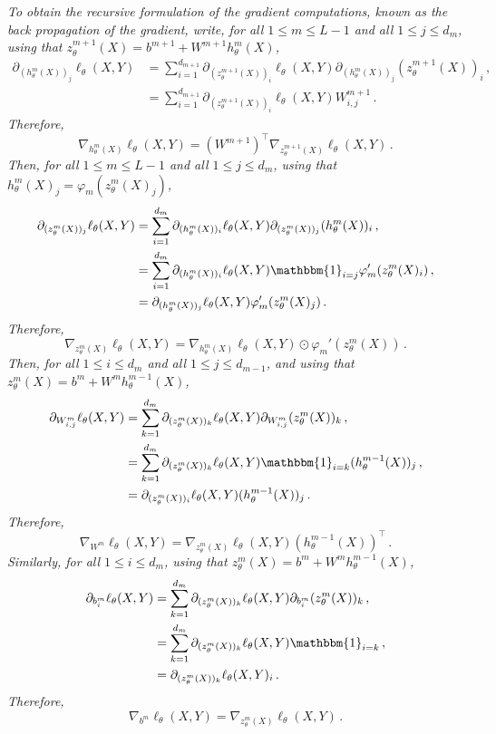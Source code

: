 \documentclass[a4paper,10pt,fleqn]{article}
\newcommand{\eqsp}{\,}
\newcommand{\1}{\ensuremath{\mathbbm{1}}}
\begin{document}
\begin{enumerate}
{\em
To obtain the recursive formulation of the gradient computations, known as the {\em back propagation} of the gradient, write, for all $1\leqslant m \leqslant L-1$ and all $1\leqslant j \leqslant d_m$,   using that $z_{\theta}^{m+1}(X) = b^{m+1} + W^{m+1}h_{\theta}^{m}(X)$,
\begin{align*}
\partial_{(h_{\theta}^m(X))_j}\ell_{\theta}(X,Y) &=  \sum_{i=1}^{d_{m+1}} \partial_{(z_{\theta}^{m+1}(X))_i}\ell_{\theta}(X,Y)\partial_{(h_{\theta}^m(X))_j}(z_{\theta}^{m+1}(X))_i\eqsp,\\
&=  \sum_{i=1}^{d_{m+1}} \partial_{(z_{\theta}^{m+1}(X))_i}\ell_{\theta}(X,Y)W^{m+1}_{i,j}\eqsp.
\end{align*}
Therefore,
$$
\nabla_{h_{\theta}^m(X)} \ell_{\theta}(X,Y) = (W^{m+1})^\top\nabla_{z_{\theta}^{m+1}(X)} \ell_{\theta}(X,Y) \eqsp.
$$
Then, for all $1\leqslant m \leqslant L-1$ and all $1\leqslant j \leqslant d_m$,  using that $h_{\theta}^{m}(X)_j =\varphi_m(z_{\theta}^{m}(X)_j)$,
\begin{align*}
\partial_{(z_{\theta}^m(X))_j}\ell_{\theta}(X,Y) &=  \sum_{i=1}^{d_{m}} \partial_{(h_{\theta}^m(X))_i}\ell_{\theta}(X,Y)\partial_{(z_{\theta}^m(X))_j}(h_{\theta}^m(X))_i\eqsp,\\
&=  \sum_{i=1}^{d_{m}} \partial_{(h_{\theta}^m(X))_i}\ell_{\theta}(X,Y) \1_{i=j}\varphi_m'(z_{\theta}^{m}(X)_i)\eqsp,\\
&= \partial_{(h_{\theta}^m(X))_j}\ell_{\theta}(X,Y) \varphi_m'(z_{\theta}^{m}(X)_j)\eqsp.
\end{align*}
Therefore,
$$
\nabla_{z_{\theta}^m(X)} \ell_{\theta}(X,Y) = \nabla_{h_{\theta}^m(X)}\ell_{\theta}(X,Y) \odot \varphi_m'(z_{\theta}^{m}(X))\eqsp.
$$
Then, for all $1\leqslant i\leqslant d_m$ and all $1\leqslant j \leqslant d_{m-1}$, and using that $z_{\theta}^m(X) = b^m + W^mh_{\theta}^{m-1}(X)$,
\begin{align*}
\partial_{W^m_{i,j}}\ell_{\theta}(X,Y) &=  \sum_{k=1}^{d_m} \partial_{(z_{\theta}^m(X))_k}\ell_{\theta}(X,Y)\partial_{W^m_{i,j}}(z_{\theta}^m(X))_k\eqsp,\\
&=  \sum_{k=1}^{d_m} \partial_{(z_{\theta}^m(X))_k}\ell_{\theta}(X,Y)\1_{i=k}(h_{\theta}^{m-1}(X))_j\eqsp,\\
&=  \partial_{(z_{\theta}^m(X))_i}\ell_{\theta}(X,Y)(h_{\theta}^{m-1}(X))_j\eqsp.
\end{align*}
Therefore,
$$
\nabla_{W^m} \ell_{\theta}(X,Y) = \nabla_{z_{\theta}^m(X)}\ell_{\theta}(X,Y)(h_{\theta}^{m-1}(X))^\top\eqsp.
$$
Similarly, for all $1\leqslant i\leqslant d_m$,  using that $z_{\theta}^m(X) = b^m + W^mh_{\theta}^{m-1}(X)$,
\begin{align*}
\partial_{b^m_{i}}\ell_{\theta}(X,Y) &=  \sum_{k=1}^{d_m} \partial_{(z_{\theta}^m(X))_k}\ell_{\theta}(X,Y)\partial_{b^m_{i}}(z_{\theta}^m(X))_k\eqsp,\\
&=  \sum_{k=1}^{d_m} \partial_{(z_{\theta}^m(X))_k}\ell_{\theta}(X,Y)\1_{i=k}\eqsp,\\
&=  \partial_{(z_{\theta}^m(X))_k}\ell_{\theta}(X,Y)_i\eqsp.
\end{align*}
Therefore,
$$
\nabla_{b^m} \ell_{\theta}(X,Y) =  \nabla_{z_{\theta}^m(X)}\ell_{\theta}(X,Y)\eqsp.
$$
}

\end{enumerate}
\end{document}
